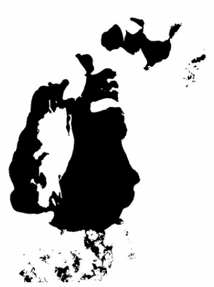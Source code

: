 \documentclass[12pt,a4paper]{article}
\begin{document}
\begin{figure}
\begin{subfigure}[b]{0.19\textwidth}
        \includegraphics[width=\textwidth]{../img/1998w.jpg}
    \end{subfigure}
    \begin{subfigure}[b]{0.19\textwidth}
        \centering

\end{subfigure}
\end{figure}
\end{document}
